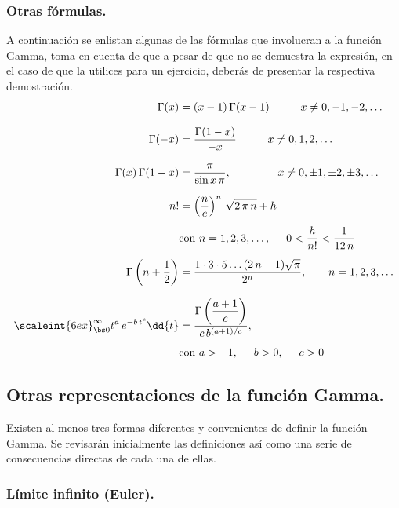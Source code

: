\subsubsection*{Otras fórmulas.}

A continuación se enlistan algunas de las fórmulas que involucran a la función Gamma, toma en cuenta de que a pesar de que no se demuestra la expresión, en el caso de que la utilices para un ejercicio, deberás de presentar la respectiva demostración.
{%
\begin{align*}
\Gamma (x) &= (x - 1) \, \Gamma(x - 1) \hspace{1cm} x \neq 0, -1, -2, \ldots \\[0.75em]
\Gamma (-x) &= \dfrac{\Gamma (1- x)}{-x} \hspace{1cm} x \neq 0, 1, 2, \ldots \\[0.75em]
\Gamma (x) \, \Gamma (1 - x) &= \dfrac{\pi}{\sin x \, \pi}, \hspace{1.5cm} x \neq 0, \pm 1, \pm 2, \pm 3, \ldots \\[0.75em]
n! &= \left( \dfrac{n}{e} \right)^{n} \, \sqrt{2 \, \pi \, n} + h \\[0.5em]
&\mbox{con } n = 1, 2, 3, \ldots, \hspace{0.5cm} 0 < \dfrac{h}{n!} < \dfrac{1}{12 \, n} \\[0.5em]
\Gamma \left(n + \dfrac{1}{2} \right) &= \dfrac{1 \cdot 3 \cdot 5 \ldots (2 \, n - 1)\sqrt{\pi}}{2^{n}}, \hspace{0.7cm} n = 1, 2, 3, \ldots \\[0.75em]
\scaleint{6ex}_{\bs 0}^{\infty} t^{a} \, e^{-b \, t^{c}} \dd{t} &= \dfrac{\Gamma \left(\dfrac{a + 1}{c} \right)}{c \, b^{(a+1)/c}}, \\[0.5em]
&\mbox{con } a > -1, \hspace{0.5cm} b > 0, \hspace{0.5cm} c > 0   
\end{align*}
}

\subsection{Otras representaciones de la función Gamma.} \label{seccion:otras_respresentaciones}

Existen al menos tres formas diferentes y convenientes de definir la función Gamma. Se revisarán inicialmente las definiciones así como una serie de consecuencias directas de cada una de ellas.

\subsubsection{Límite infinito (Euler).}

